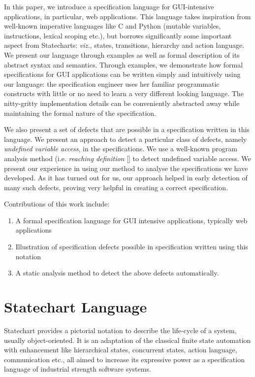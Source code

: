 \documentclass[12pt,a4paper]{article}
\begin{document}
In this paper, we introduce a specification language for GUI-intensive applications, in particular, web applications. This language takes inspiration from well-known imperative languages like C and Python (mutable variables, instructions, lexical scoping etc.), but borrows significantly some important aspect from Statecharts: \emph{viz.}, states, transitions, hierarchy and action language. We present our language through examples as well as  formal description of its abstract syntax and semantics. Through examples, we demonstrate how formal specifications for GUI applications can be written simply and intuitively using our language: the specification engineer uses her familiar programmatic constructs with little or no need to learn a very different looking language. The nitty-gritty implementation details can be conveniently abstracted away while maintaining the formal nature of the specification.

We also present a set of defects that are possible in a specification written in this language. We present an approach to detect a particular class of defects, namely \emph{undefined variable access}, in the specifications. We use a well-known program analysis method (i.e. \emph{reaching definition} [] to detect undefined variable access. We present our experience in using our method to analyse the specifications we have developed. As it has turned out for us, our approach helped in early detection of many such defects, proving very helpful in creating a correct specification.

Contributions of this work include:
\begin{enumerate}
	\item A formal specification language for GUI intensive applications, typically web applications
	\item Illustration of specification defects possible in specification written using this notation
	\item A static analysis method to detect the above defects automatically.
\end{enumerate}

\section{Statechart Language}
Statechart provides a pictorial notation to describe the life-cycle of a system, usually object-oriented. It is an adaptation of the classical finite state automation with enhancement like hierarchical states, concurrent states, action language, communication etc., all aimed to increase its expressive power as a specification language of industrial strength software systems. 
\end{document}

